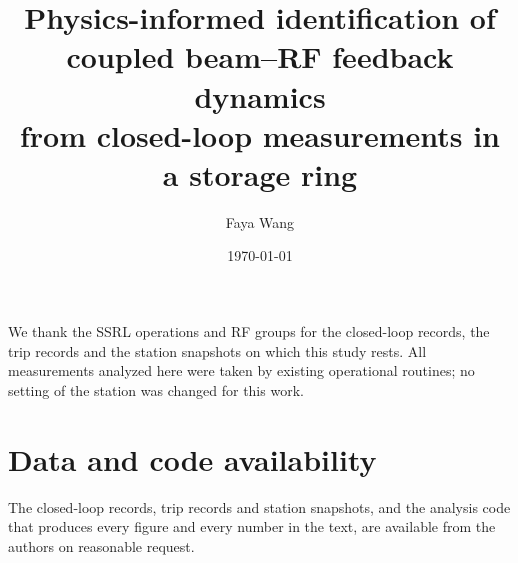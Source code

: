 \documentclass[aps,prab,twocolumn,superscriptaddress,nofootinbib,floatfix]{revtex4-2}
\begin{document}
\title{Physics-informed identification of coupled beam--RF feedback dynamics\\from closed-loop measurements in a storage ring}

\author{Faya Wang}

\date{\today}

\begin{abstract}

\end{abstract}

\maketitle




\begin{acknowledgments}
We thank the SSRL operations and RF groups for the closed-loop records, the trip records and the station snapshots on which this study rests. All measurements analyzed here were taken by existing operational routines; no setting of the station was changed for this work.
\end{acknowledgments}

\section*{Data and code availability}
The closed-loop records, trip records and station snapshots, and the analysis code that produces every figure and every number in the text, are available from the authors on reasonable request.

\appendix



\end{document}
